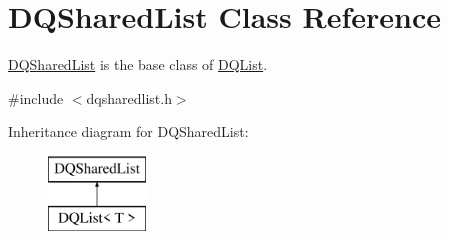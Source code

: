 \hypertarget{classDQSharedList}{
\section{DQSharedList Class Reference}
\label{classDQSharedList}
}


\hyperlink{classDQSharedList}{DQSharedList} is the base class of \hyperlink{classDQList}{DQList}.  




{\ttfamily \#include $<$dqsharedlist.h$>$}

Inheritance diagram for DQSharedList:\begin{figure}[H]
\begin{center}
\leavevmode
\includegraphics[height=2.000000cm]{classDQSharedList}
\end{center}
\end{figure}
